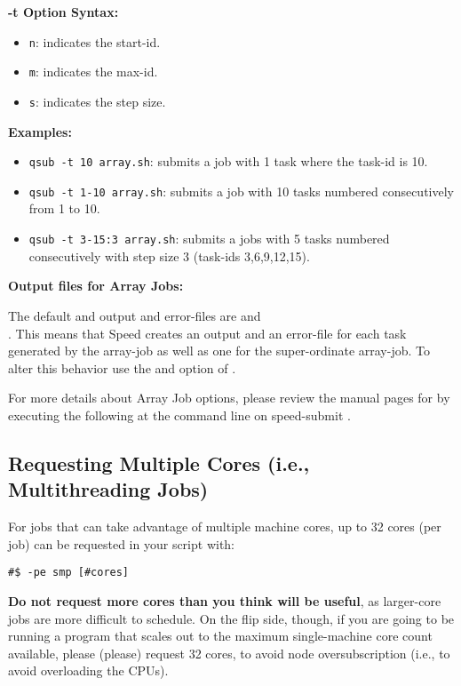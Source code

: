 \documentclass{easychair}
\begin{document}
\textbf{-t Option Syntax:}
\begin{itemize}
\item
\texttt{n}: indicates the start-id.
\item
\texttt{m}: indicates the max-id.
\item
\texttt{s}: indicates the step size.
\end{itemize}

\textbf{Examples:}
\begin{itemize}
\item
\texttt{qsub -t 10 array.sh}: submits a job with 1 task where the task-id is 10. 
\item
\texttt{qsub -t 1-10 array.sh}: submits a job with 10 tasks numbered consecutively from 1 to 10.
\item
\texttt{qsub -t 3-15:3 array.sh}: submits a jobs with 5 tasks numbered consecutively with step size 3
(task-ids 3,6,9,12,15).
\end{itemize}

\textbf{Output files for Array Jobs:}

The default and output and error-files are  and\\
.
%
This means that Speed creates an output and an error-file for each task 
generated by the array-job as well as one for the super-ordinate array-job. 
To alter this behavior use the  and  option of
. 

For more details about Array Job options, please review the manual pages for 
 by executing the following at the command line on speed-submit 
.
 
\subsection{Requesting Multiple Cores (i.e., Multithreading Jobs)}

For jobs that can take advantage of multiple machine cores, up to 32 cores
(per job) can be requested in your script with: 

\begin{verbatim}
#$ -pe smp [#cores] 
\end{verbatim}

\textbf{Do not request more cores than you think will be useful}, as larger-core
jobs are more difficult to schedule. On the flip side, though, if you 
are going to be running a program that scales out to the maximum single-machine
core count available, please (please) request 32 cores, to avoid node 
oversubscription (i.e., to avoid overloading the CPUs).
\end{document}

